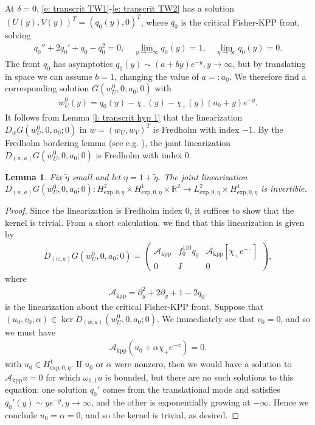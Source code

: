 \documentclass[11pt]{article}
\newcommand{\R}{\mathbb{R}}
\newtheorem{lemma}[prop]{Lemma}
\numberwithin{equation}{section}
\numberwithin{prop}{section}
\begin{document}
At $\delta = 0$, \eqref{e: transcrit TW1}-\eqref{e: transcrit TW2} has a solution $(U(y), V(y))^T = (q_0(y), 0)^T$, where $q_0$ is the critical Fisher-KPP front, solving
\begin{align}
	q_0'' + 2 q_0' + q_0 - q_0^2 = 0, \quad \lim_{y \to -\infty} q_0 (y) = 1, \quad \lim_{y \to \infty} q_0 (y) = 0. 
\end{align} 
The front $q_0$ has asymptotics $q_0(y) \sim (a + by) e^{-y}, y \to \infty$, but by translating in space we can assume $b = 1$, changing the value of $a =: a_0$. We therefore find a corresponding solution $G(w_U^0, 0, a_0; 0)$ with
\begin{align}
	w_U^0 (y) = q_0 (y) - \chi_- (y) - \chi_+(y) (a_0 + y) e^{-y}. 
\end{align}
It follows from Lemma \ref{l: transcrit hyp 1} that the linearization $D_w G (w_U^0, 0, a_0; 0)$ in $w = (w_U, w_V)^T$ is Fredholm with index $-1$. By the Fredholm bordering lemma (see e.g. \cite[Lemma 4.4]{ArndBjornRelativeMorse}), the joint linearization $D_{(w, a)} G (w_U^0, 0, a_0; 0)$ is Fredholm with index 0. 
\begin{lemma}\label{l: transcrit lin invertible}
	Fix $\tilde{\eta}$ small and let $\eta = 1 + \tilde{\eta}$. The joint linearization $D_{(w,a)} G (w_U^0, 0, a_0; 0) :  H^2_{\mathrm{exp}, 0, \eta} \times H^1_{\mathrm{exp}, 0, \eta} \times \R^2 \to L^2_{\mathrm{exp}, 0, \eta} \times H^1_{\mathrm{exp}, 0, \eta}$ is invertible.
\end{lemma}
\begin{proof}
	Since the linearization is Fredholm index 0, it suffices to show that the kernel is trivial. From a short calculation, we find that this linearization is given by
	\begin{align*}
		D_{(w,a)} G (w_U^0, 0, a_0; 0) = \begin{pmatrix}
			\mathcal{A}_\mathrm{kpp} & f_0^{110} q_0 & \mathcal{A}_\mathrm{kpp} [\chi_+ e^{-\cdot}]  \\
			0 & I & 0
		\end{pmatrix},
	\end{align*}
	where
	\begin{align}
		\mathcal{A}_\mathrm{kpp} = \partial_y^2 + 2 \partial_y + 1 - 2 q_0. 
	\end{align}
	is the linearization about the critical Fisher-KPP front. 
	Suppose that $(u_0, v_0, \alpha) \in \ker D_{(w,a)} (w_U^0, 0, a_0; 0)$. We immediately see that $v_0 = 0$, and so we must have
	\begin{align}
		\mathcal{A}_\mathrm{kpp} (u_0 + \alpha \chi_+ e^{-x}) = 0. 
	\end{align}
	with $u_0 \in H^1_{\mathrm{exp}, 0, \eta}$. 
	If $u_0$ or $\alpha$ were nonzero, then we would have a solution to $\mathcal{A}_\mathrm{kpp} u =0$ for which $\omega_{0,1} u$ is bounded, but there are no such solutions to this equation: one solution $q_0'$ comes from the translational mode and satisfies $q_0'(y) \sim y e^{-y}, y \to \infty$, and the other is exponentially growing at $-\infty$. Hence we conclude $u_0 = \alpha = 0$, and so the kernel is trivial, as desired. 
\end{proof}
\end{document}
